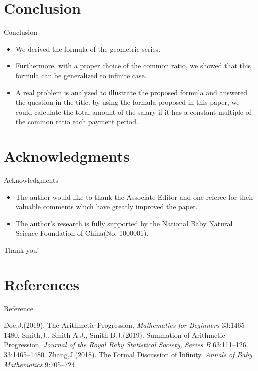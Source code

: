 \section{Conclusion}
\begin{frame}{Conclusion}
    \begin{itemize}[<+->]
        \item We derived the formula of the geometric series.
        \item Furthermore, with a proper choice of the common ratio, we showed that this formula can be generalized to infinite case.
        \item A real problem is analyzed to illustrate the proposed formula and answered the question in the title: by using the formula proposed in this paper, we could calculate the total amount of the salary if it has a constant multiple of the common ratio each payment period.
    \end{itemize}
\end{frame}



\section{Acknowledgments}
\begin{frame}{Acknowledgments}
    \begin{itemize}[<+->]
        \item The author would like to thank the Associate Editor and one referee for their valuable comments which have greatly improved the paper.
        \item The author's research is fully supported by the National Baby Natural Science Foundation of China(No. 1000001).
    \end{itemize}
\end{frame}

\begin{frame}
    \centering\Huge Thank you!
\end{frame}



\section{References}
\begin{frame}[c, allowframebreaks]{Reference}
    \begin{thebibliography}{9}\large
         Doe,J.(2019). The Arithmetic Progression. \emph{Mathematics for Beginners} 33:1465–1480.
         Smith,J., Smith A.J., Smith B.J.(2019). Summation of Arithmetic Progression. \emph{Journal of the Royal Baby Statistical Society, Series B} 63:111–126. 33:1465–1480.
         Zhang,J.(2018). The Formal Discussion of Infinity. \emph{Annals of Baby Mathematics} 9:705–724.
    \end{thebibliography}
\end{frame}
